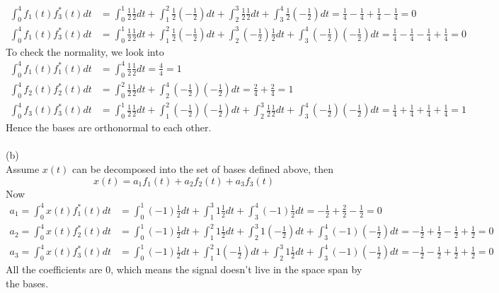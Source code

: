 \documentclass [12pt] {article}
\begin{document}
\begin{spacing}{1.5}
\begin{align*}
\int_{0}^{4} f_{1}(t)f_{3}^{*}(t) dt & = \int_{0}^{1} \frac{1}{2}\frac{1}{2} dt + \int_{1}^{2} \frac{1}{2}(-\frac{1}{2}) dt + \int_{2}^{3} \frac{1}{2}\frac{1}{2} dt  +\int_{3}^{4} \frac{1}{2}(-\frac{1}{2}) dt = \frac{1}{4} - \frac{1}{4} +  \frac{1}{4} - \frac{1}{4} = 0\\
\int_{0}^{4} f_{1}(t)f_{3}^{*}(t) dt & = \int_{0}^{1} \frac{1}{2}\frac{1}{2} dt + \int_{1}^{2} \frac{1}{2}(-\frac{1}{2}) dt + \int_{2}^{3} (-\frac{1}{2})\frac{1}{2} dt  +\int_{3}^{4} (-\frac{1}{2})(-\frac{1}{2}) dt = \frac{1}{4} - \frac{1}{4} -  \frac{1}{4} + \frac{1}{4} = 0
\end{align*}
To check the normality, we look into
 \begin{align*}
\int_{0}^{4} f_{1}(t)f_{1}^{*}(t) dt & = \int_{0}^{4} \frac{1}{2}\frac{1}{2} dt  = \frac{4}{4} = 1\\
\int_{0}^{4} f_{2}(t)f_{2}^{*}(t) dt & = \int_{0}^{2} \frac{1}{2}\frac{1}{2} dt + \int_{2}^{4} (-\frac{1}{2})(-\frac{1}{2}) dt  = \frac{2}{4} + \frac{2}{4} = 1\\
\int_{0}^{4} f_{3}(t)f_{3}^{*}(t) dt & = \int_{0}^{1} \frac{1}{2}\frac{1}{2} dt + \int_{1}^{2} (-\frac{1}{2})(-\frac{1}{2}) dt + \int_{2}^{3} \frac{1}{2}\frac{1}{2} dt  +\int_{3}^{4} (-\frac{1}{2})(-\frac{1}{2}) dt = \frac{1}{4} + \frac{1}{4} +  \frac{1}{4} + \frac{1}{4} = 1
\end{align*}
Hence the bases are orthonormal to each other. \\
~\\
(b)\\
Assume $x(t)$ can be decomposed into the set of bases defined above, then
$$ x(t) = a_1 f_1(t) + a_2 f_2(t) + a_3 f_3(t) $$
Now
 \begin{align*}
a_1 = \int_{0}^{4} x(t)f_{1}^{*}(t) dt & = \int_{0}^{1} (-1)\frac{1}{2} dt + \int_{1}^{3} 1\frac{1}{2} dt  + \int_{3}^{4} (-1)\frac{1}{2} dt  = -\frac{1}{2} + \frac{2}{2} - \frac{1}{2} = 0\\
a_2 = \int_{0}^{4} x(t)f_{2}^{*}(t) dt & = \int_{0}^{1} (-1)\frac{1}{2} dt + \int_{1}^{2} 1\frac{1}{2} dt  + \int_{2}^{3} 1(-\frac{1}{2}) dt + \int_{3}^{4} (-1)(-\frac{1}{2}) dt  = -\frac{1}{2} + \frac{1}{2} - \frac{1}{2} + \frac{1}{2} = 0\\
a_3 = \int_{0}^{4} x(t)f_{3}^{*}(t) dt & = \int_{0}^{1} (-1)\frac{1}{2} dt + \int_{1}^{2} 1(-\frac{1}{2}) dt  + \int_{2}^{3} 1\frac{1}{2} dt + \int_{3}^{4} (-1)(-\frac{1}{2}) dt  = -\frac{1}{2} - \frac{1}{2} + \frac{1}{2} + \frac{1}{2} = 0
\end{align*}
All the coefficients are 0, which means the signal doesn't live in the space span by the bases. \\

\end{spacing}
\end{document}

